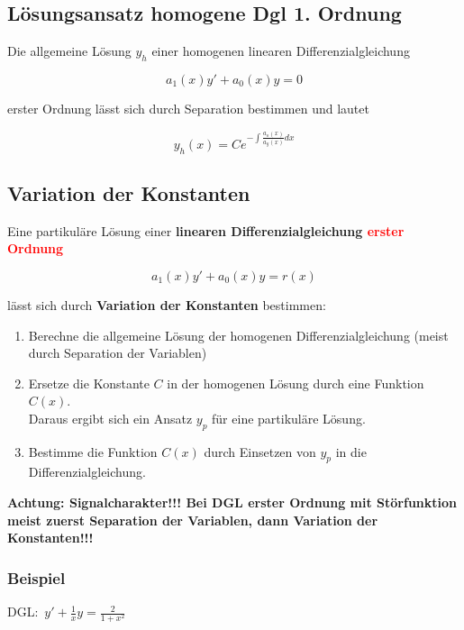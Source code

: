 \documentclass[12pt, a4paper]{scrreprt}
\begin{document}
\subsection{Lösungsansatz homogene Dgl 1. Ordnung}

Die allgemeine Lösung \(y_h\) einer homogenen linearen Differenzialgleichung

\[
  a_1(x)y'+a_0(x)y=0
\]

erster Ordnung lässt sich durch Separation bestimmen und lautet

\[
  y_h(x)=Ce^{-\int{\frac{a_o(x)}{a_y(x)}dx}}
\]

\subsection{Variation der Konstanten}

Eine partikuläre Lösung einer \textbf{linearen Differenzialgleichung \textcolor{red}{erster Ordnung}}

\[
  a_1(x)y'+a_0(x)y=r(x)
\]

lässt sich durch \textbf{Variation der Konstanten} bestimmen:

\begin{enumerate}
\item Berechne die allgemeine Lösung der homogenen Differenzialgleichung (meist durch Separation der Variablen)
\item Ersetze die Konstante \(C\) in der homogenen Lösung durch eine Funktion \(C(x)\).\\
  Daraus ergibt sich ein Ansatz \(y_p\) für eine partikuläre Lösung.
\item Bestimme die Funktion \(C(x)\) durch Einsetzen von \(y_p\) in die Differenzialgleichung.
\end{enumerate}

\begin{framed}
  \textbf{Achtung: Signalcharakter!!! Bei DGL erster Ordnung mit Störfunktion meist zuerst Separation der Variablen, dann Variation der Konstanten!!!}
\end{framed}

\subsubsection{Beispiel}

DGL:\ \(y'+\frac{1}{x}y=\frac{2}{1+x^2}\)
\end{document}
